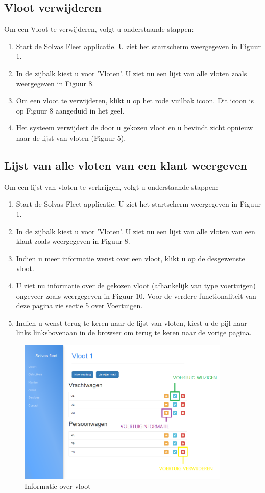 \documentclass[11pt,openany]{article}
\begin{document}
\subsection{Vloot verwijderen}
Om een Vloot te verwijderen, volgt u onderstaande stappen:
\begin{enumerate}
	\item Start de Solvas Fleet applicatie. U ziet het startscherm weergegeven in Figuur 1.
	\item In de zijbalk kiest u voor 'Vloten'. U ziet nu een lijst van alle vloten zoals weergegeven in Figuur 8.
	\item Om een vloot te verwijderen, klikt u op het rode vuilbak icoon. Dit icoon is op Figuur 8 aangeduid in het geel.
	\item Het systeem verwijdert de door u gekozen vloot en u bevindt zicht opnieuw naar de lijst van vloten (Figuur 5).
\end{enumerate}

\subsection{Lijst van alle vloten van een klant weergeven}
Om een lijst van vloten te verkrijgen, volgt u onderstaande stappen:
\begin{enumerate}
	\item Start de Solvas Fleet applicatie. U ziet het startscherm weergegeven in Figuur 1.
	\item In de zijbalk kiest u voor 'Vloten'. U ziet nu een lijst van alle vloten van een klant zoals weergegeven in Figuur 8.
	\item Indien u meer informatie wenst over een vloot, klikt u op de desgewenste vloot. 
	\item U ziet nu informatie over de gekozen vloot (afhankelijk van type voertuigen)
	ongeveer zoals weergegeven in Figuur 10. Voor de verdere functionaliteit van deze pagina zie sectie 5 over Voertuigen. 
	\item Indien u wenst terug te keren naar de lijst van vloten, kiest u de pijl naar links  linksbovenaan in de browser om terug te keren naar de vorige pagina.
\end{enumerate}

\begin{figure}
	\centering
	\includegraphics[width=0.9\textwidth]{fig10.png}
	\caption{Informatie over vloot}
\end{figure}
\end{document}
